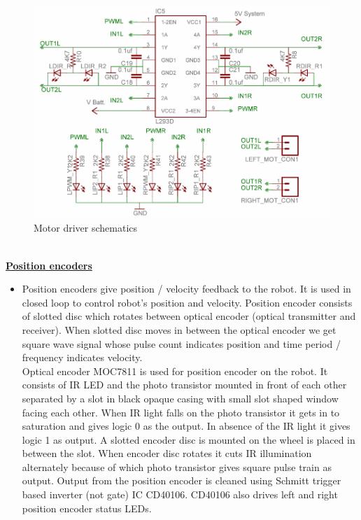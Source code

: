 \documentclass[a4paper,12pt,oneside]{book}
\begin{document}
	\hfill\\
	\begin{figure}[h!]
		\caption{Motor driver schematics}
		\includegraphics[width=\textwidth]{./HardwareManual/l293d.png}
	\end{figure}
	\hfill\\
	
	\underline{\textbf{\Large{Position encoders}}}
	\begin{itemize}
	\item {Position encoders give position / velocity feedback to the robot. It is used in closed loop to
		control robot’s position and velocity. Position encoder consists of slotted disc which rotates
		between optical encoder (optical transmitter and receiver). When slotted disc moves in between
		the optical encoder we get square wave signal whose pulse count indicates position and time
		period / frequency indicates velocity.\\
		Optical encoder MOC7811 is used for position encoder on the robot. It consists of IR LED and
		the photo transistor mounted in front of each other separated by a slot in black opaque casing
		with small slot shaped window facing each other. When IR light falls on the photo transistor it
		gets in to saturation and gives logic 0 as the output. In absence of the IR light it gives logic 1 as
		output. A slotted encoder disc is mounted on the wheel is placed in between the slot. When
		encoder disc rotates it cuts IR illumination alternately because of which photo transistor gives
		square pulse train as output. Output from the position encoder is cleaned using Schmitt trigger
		based inverter (not gate) IC CD40106. CD40106 also drives left and right position encoder status
		LEDs.
	}
	\end{itemize}
\end{document}
